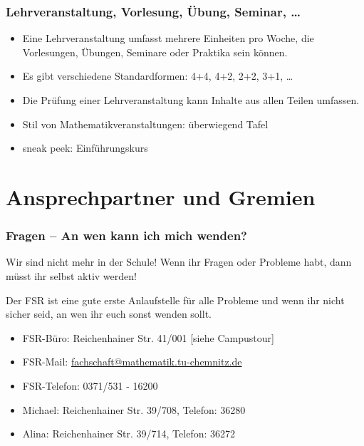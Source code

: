 \begin{frame}
\frametitle{Lehrveranstaltung, Vorlesung, Übung, Seminar, \dots}
\begin{itemize}
	\item Eine Lehrveranstaltung umfasst mehrere Einheiten pro Woche, die Vorlesungen, Übungen, Seminare oder Praktika sein können. 
	\item Es gibt verschiedene Standardformen: 4+4, 4+2, 2+2, 3+1, \dots
	\item Die Prüfung einer Lehrveranstaltung kann Inhalte aus allen Teilen umfassen.
	\item Stil von Mathematikveranstaltungen: überwiegend Tafel
	\item sneak peek: Einführungskurs
\end{itemize}
\end{frame}

\section{Ansprechpartner und Gremien}
\frame{\tableofcontents[currentsection]}

\begin{frame}
\frametitle{Fragen -- An wen kann ich mich wenden?}
Wir sind nicht mehr in der Schule! Wenn ihr Fragen oder Probleme habt, dann müsst ihr selbst aktiv werden!
\begin{block}{\vphantom{X}}
	Der FSR ist eine gute erste Anlaufstelle für alle Probleme und wenn ihr nicht sicher seid, an wen ihr euch sonst wenden sollt.
\end{block}
\begin{itemize}
	\item FSR-Büro: Reichenhainer Str. 41/001 [siehe Campustour]
	\item FSR-Mail: \href{mailto:fachschaft@mathematik.tu-chemnitz.de}{fachschaft@mathematik.tu-chemnitz.de} 
	\item FSR-Telefon: 0371/531 - 16200
	\item Michael: Reichenhainer Str. 39/708, Telefon: 36280 
	\item Alina: Reichenhainer Str. 39/714, Telefon: 36272
\end{itemize}
\end{frame}

